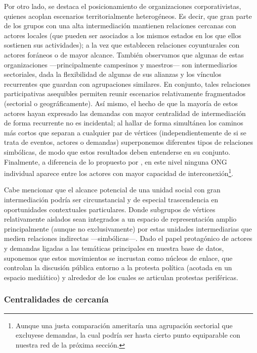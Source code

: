 \documentclass[letterpaper, 11pt]{book}
\theoremstyle{definition}
\theoremstyle{remark}
\begin{document}
Por otro lado, se destaca el posicionamiento de organizaciones corporativistas, quienes acoplan escenarios territorialmente heterogéneos. 
Es decir, que gran parte de los grupos con una alta intermediación mantienen relaciones cercanas con actores locales (que pueden ser asociados a los mismos estados en los que ellos sostienen sus actividades); a la vez que establecen relaciones coyunturales con actores foráneos o de mayor alcance. 
También observamos que algunas de estas organizaciones ---principalmente campesinos y maestros--- son intermediarios sectoriales, dada la flexibilidad de algunas de sus alianzas y los vínculos recurrentes que guardan con agrupaciones similares. 
En conjunto, tales relaciones participativas asequibles permiten reunir escenarios relativamente fragmentados (sectorial o geográficamente). 
Así mismo, el hecho de que la mayoría de estos actores hayan expresado las demandas con mayor centralidad de intermediación de forma recurrente no es incidental; al hallar de forma simultánea los caminos más cortos que separan a cualquier par de vértices (independientemente de si se trata de eventos, actores o demandas) superponemos diferentes tipos de relaciones simbólicas, de modo que estos resultados deben entenderse en su conjunto. 
Finalmente, a diferencia de lo propuesto por \citet{2003_Wada_Tesis}, en este nivel ninguna ONG individual aparece entre los actores con mayor capacidad de interconexión\footnote{
    Aunque una justa comparación ameritaría una agrupación sectorial que excluyese demandas, la cual podría ser hasta cierto punto equiparable con nuestra red de la próxima sección. 
}. 


Cabe mencionar que el alcance potencial de una unidad social con gran intermediación podría ser circunstancial y de especial trascendencia en oportunidades contextuales particulares. 
Donde subgrupos de vértices relativamente aislados sean integrados a un espacio de representación amplio principalmente (aunque no exclusivamente) por estas unidades intermediarias que medien relaciones indirectas ---simbólicas---.
Dado el papel protagónico de actores y demandas ligadas a las temáticas principales en nuestra base de datos, suponemos que estos movimientos se incrustan como núcleos de enlace, que controlan la discusión pública entorno a la protesta política (acotada en un espacio mediático) y  alrededor de los cuales se articulan protestas periféricas. 



\subsubsection{Centralidades de cercanía}
\label{subsubsec:Centralidades_cercania_3part}
\end{document}
